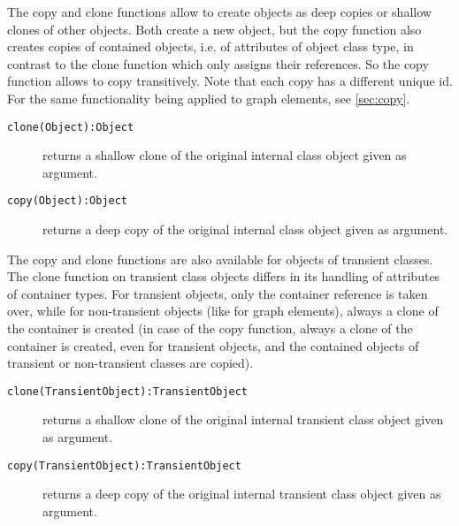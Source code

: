 The copy and clone functions allow to create objects as deep copies or shallow clones of other objects.
Both create a new object, but the copy function also creates copies of contained objects, i.e. of attributes of object class type, in contrast to the clone function which only assigns their references.
So the copy function allows to copy transitively.
Note that each copy has a different unique id.
For the same functionality being applied to graph elements, see \ref{sec:copy}.

\begin{description}
\item[\texttt{clone(Object):Object}] returns a shallow clone of the original internal class object given as argument.
\item[\texttt{copy(Object):Object}] returns a deep copy of the original internal class object given as argument.
\end{description}

The copy and clone functions are also available for objects of transient classes.
The clone function on transient class objects differs in its handling of attributes of container types.
For transient objects, only the container reference is taken over, while for non-transient objects (like for graph elements), always a clone of the container is created (in case of the copy function, always a clone of the container is created, even for transient objects, and the contained objects of transient or non-transient classes are copied).

\begin{description}
\item[\texttt{clone(TransientObject):TransientObject}] returns a shallow clone of the original internal transient class object given as argument.
\item[\texttt{copy(TransientObject):TransientObject}] returns a deep copy of the original internal transient class object given as argument.
\end{description}


